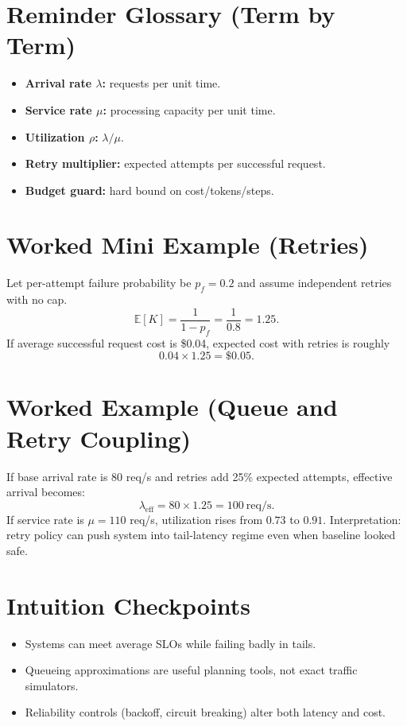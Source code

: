 \section*{Reminder Glossary (Term by Term)}
\begin{itemize}[leftmargin=1.5em]
  \item \textbf{Arrival rate $\lambda$:} requests per unit time.
  \item \textbf{Service rate $\mu$:} processing capacity per unit time.
  \item \textbf{Utilization $\rho$:} $\lambda/\mu$.
  \item \textbf{Retry multiplier:} expected attempts per successful request.
  \item \textbf{Budget guard:} hard bound on cost/tokens/steps.
\end{itemize}

\section*{Worked Mini Example (Retries)}
Let per-attempt failure probability be $p_f=0.2$ and assume independent retries with no cap.
\[
\mathbb{E}[K]=\frac{1}{1-p_f}=\frac{1}{0.8}=1.25.
\]
If average successful request cost is \$0.04, expected cost with retries is roughly
\[
0.04\times 1.25 = \$0.05.
\]

\section*{Worked Example (Queue and Retry Coupling)}
If base arrival rate is 80 req/s and retries add 25\% expected attempts, effective arrival becomes:
\[
\lambda_{\text{eff}} = 80 \times 1.25 = 100\ \text{req/s}.
\]
If service rate is $\mu=110$ req/s, utilization rises from $0.73$ to $0.91$.  
Interpretation: retry policy can push system into tail-latency regime even when baseline looked safe.

\section*{Intuition Checkpoints}
\begin{itemize}[leftmargin=1.5em]
  \item Systems can meet average SLOs while failing badly in tails.
  \item Queueing approximations are useful planning tools, not exact traffic simulators.
  \item Reliability controls (backoff, circuit breaking) alter both latency and cost.
\end{itemize}

